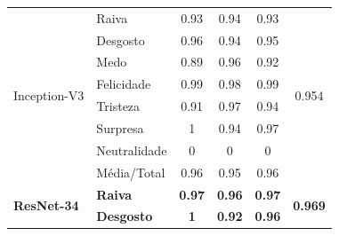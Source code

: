 \begin{table}[]
\begin{tabular}{llcccc}
\multirow{8}{*}{Inception-V3}     & Raiva                 & 0.93                                  & 0.94                                   & 0.93                                  & \multirow{8}{*}{0.954}                \\
                                       & Desgosto              & 0.96                                  & 0.94                                   & 0.95                                  &                                       \\
                                       & Medo                  & 0.89                                  & 0.96                                   & 0.92                                  &                                       \\
                                       & Felicidade            & 0.99                                  & 0.98                                   & 0.99                                  &                                       \\
                                       & Tristeza              & 0.91                                  & 0.97                                   & 0.94                                  &                                       \\
                                       & Surpresa              & 1                                     & 0.94                                   & 0.97                                  &                                       \\
                                       & Neutralidade          & 0                                     & 0                                      & 0                                     &                                       \\
                                       & Média/Total           & 0.96                                  & 0.95                                   & 0.96                                  &                                       \\ \hline
\multirow{8}{*}{\textbf{ResNet-34}} & \textbf{Raiva}        & \textbf{0.97}                         & \textbf{0.96}                          & \textbf{0.97}                         & \multirow{8}{*}{\textbf{0.969}}       \\
                                       & \textbf{Desgosto}     & \textbf{1}                            & \textbf{0.92}                          & \textbf{0.96}                         &                                       \\

\end{tabular}
\end{table}
